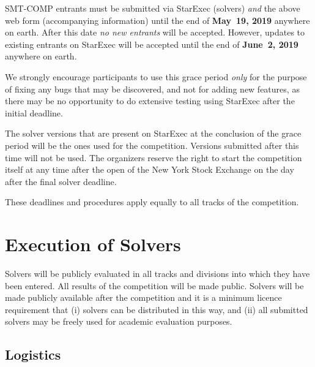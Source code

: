 \documentclass[12pt]{article}
\newcommand{\rem}[1]{\textcolor{red}{[#1]}}
\newcommand{\an}[1]{\rem{#1 -- aina}}
\begin{document}
SMT-COMP entrants must be submitted via StarExec (solvers) \emph{and}
the above web form (accompanying information) until the end of
{\bf May~19, 2019} anywhere on earth.
After this date \emph{no new entrants} will be accepted.
However, updates to existing entrants on StarExec
will be accepted until the end of {\bf June~2, 2019} anywhere on earth.

We strongly encourage participants to use this grace period
\emph{only} for the purpose of fixing any bugs that may be discovered,
and not for adding new features, as there may be no opportunity to do
extensive testing using StarExec after the initial deadline.

The solver versions that are present on StarExec at the conclusion of
the grace period will be the ones used for the competition.  Versions
submitted after this time will not be used.  The organizers reserve
the right to start the competition itself at any time after the open
of the New York Stock Exchange on the day after the final solver
deadline.

These deadlines and procedures apply equally to all tracks of the
competition.




\section{Execution of Solvers}

Solvers will be publicly evaluated in all tracks and divisions into
which they have been entered.  All results of the competition will be
made public. Solvers will be made publicly available after the competition and it is a minimum licence requirement that (i) solvers can be distributed in this way, and (ii) all submitted solvers may be freely used for academic evaluation purposes.



\subsection{Logistics}
\label{sec:logistics}
\end{document}
